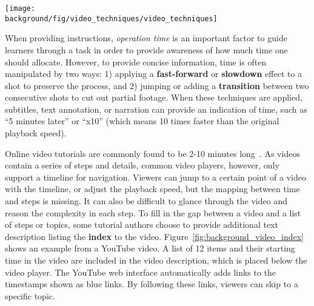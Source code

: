 \begin{figure*}[h!]
  \centering
  \texttt{[image: \\background/fig/video\_techniques/video\_techniques]}
  \begin{minipage}{\textwidth}
  \caption[Example video editing techniques used in a video tutorial.]{
    Example video editing techniques used in a video tutorial\footnote{Mountain Buggy, Nano™ Instructional Guide, \url{https://youtu.be/p6MzLXeWBJw}}:
    (a) a sequence of overview and detailed shots, and
    (b) a title scene to introduce a new section, which can include animation or movement as a preview.
  }
  \label{fig:background_video_techniques}
  \end{minipage}
\end{figure*}


When providing instructions, \emph{operation time} is an important factor to guide learners through a task in order to provide awareness of how much time one should allocate.
%
However, to provide concise information, time is often manipulated by two ways: 1) applying a \textbf{fast-forward} or \textbf{slowdown} effect to a shot to preserve the process, and 2) jumping or adding a \textbf{transition} between two consecutive shots to cut out partial footage.
%
When these techniques are applied, subtitles, text annotation, or narration can provide an indication of time, such as ``5 minutes later'' or ``x10'' (which means 10 times faster than the original playback speed).




Online video tutorials are commonly found to be 2-10 minutes long~\cite{Chi:2013:DGC:2501988.2502052}. As videos contain a series of steps and details, common video players, however, only support a timeline for navigation. Viewers can jump to a certain point of a video with the timeline, or adjust the playback speed, but the mapping between time and steps is missing. It can also be difficult to glance through the video and reason the complexity in each step.
%
To fill in the gap between a video and a list of steps or topics, some tutorial authors choose to provide additional text description listing the \textbf{index} to the video. Figure~\ref{fig:background_video_index} shows an example from a YouTube video. A list of 12 items and their starting time in the video are included in the video description, which is placed below the video player. The YouTube web interface automatically adds links to the timestamps shown as blue links. By following these links, viewers can skip to a specific topic.

